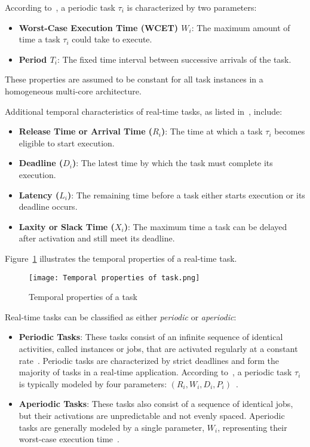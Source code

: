 \documentclass[conference]{IEEEtran}
\begin{document}
According to~\cite{5465974}, a periodic task $\tau_i$ is characterized by two parameters:
\begin{itemize}
    \item \textbf{Worst-Case Execution Time (WCET) $W_i$}: The maximum amount of time a task $\tau_i$ could take to execute.
    \item \textbf{Period $T_i$}: The fixed time interval between successive arrivals of the task.
\end{itemize}
These properties are assumed to be constant for all task instances in a homogeneous multi-core architecture.

Additional temporal characteristics of real-time tasks, as listed in~\cite{AbdallahGB24}, include:
\begin{itemize}
    \item \textbf{Release Time or Arrival Time ($R_i$)}: The time at which a task $\tau_i$ becomes eligible to start execution.
    \item \textbf{Deadline ($D_i$)}: The latest time by which the task must complete its execution.
    \item \textbf{Latency ($L_i$)}: The remaining time before a task either starts execution or its deadline occurs.
    \item \textbf{Laxity or Slack Time ($X_i$)}: The maximum time a task can be delayed after activation and still meet its deadline.
\end{itemize}

Figure~\ref{fig:temporal_properties_of_task} illustrates the temporal properties of a real-time task.

\begin{figure}[h!]
    \centering
    \texttt{[image: Temporal properties of task.png]}
    \caption{Temporal properties of a task}
    \label{fig:temporal_properties_of_task}
\end{figure}

Real-time tasks can be classified as either \textit{periodic} or \textit{aperiodic}:
\begin{itemize}
    \item \textbf{Periodic Tasks}: These tasks consist of an infinite sequence of identical activities, called instances or jobs, that are activated regularly at a constant rate~\cite{butazo99}. Periodic tasks are characterized by strict deadlines and form the majority of tasks in a real-time application. According to~\cite{french18}, a periodic task $\tau_i$ is typically modeled by four parameters: $(R_i, W_i, D_i, P_i)$~\cite{AbdallahGB24}.
    
    \item \textbf{Aperiodic Tasks}: These tasks also consist of a sequence of identical jobs, but their activations are unpredictable and not evenly spaced. Aperiodic tasks are generally modeled by a single parameter, $W_i$, representing their worst-case execution time~\cite{AbdallahGB24}.
\end{itemize}
\end{document}
